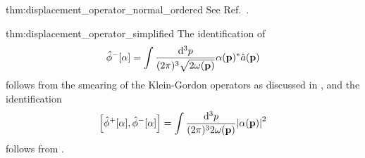 \begin{delayedproof}{thm:displacement_operator_normal_ordered}
	See Ref.~\cite[p.~48]{Barnett2002}.
\end{delayedproof}
\begin{delayedproof}{thm:displacement_operator_simplified}
	The identification of
	\begin{equation*}
		\hat\phi^-[\alpha]
		=
		\int\frac{\dd[3]{p}}{(2\pi)^3\sqrt{2\omega(\vb{p})}}
		\alpha(\vb{p})^*
		\hat{a}(\vb{p})
	\end{equation*}
	follows from the smearing of the Klein-Gordon operators as discussed in ,
	and the identification
	\begin{equation*}
		\comm{\hat\phi^+[\alpha]}{\hat\phi^-[\alpha]}
		=
		\int\frac{\dd[3]{p}}{(2\pi)^32\omega(\vb{p})}
		\abs{\alpha(\vb{p})}^2
	\end{equation*}
	follows from .
\end{delayedproof}
